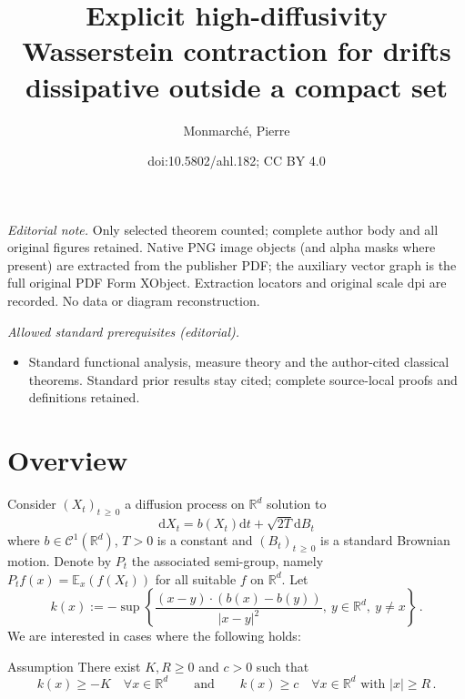 \documentclass[10pt]{amsart}
\title{Explicit high-diffusivity Wasserstein contraction for drifts dissipative outside a compact set}
\author{Monmarché, Pierre}
\date{doi:10.5802/ahl.182; CC BY 4.0}
\theoremstyle{definition}\newtheorem{defi}[theo]{Definition}\newtheorem{rema}[theo]{Remark}\newtheorem{exam}[theo]{Example}\newtheorem{exem}[theo]{Example}\newtheorem{nota}[theo]{Notation}
\newcommand{\R}{\mathbb R}
\newcommand{\bbE}{\mathbb E}
\newcommand{\clC}{\mathcal C}
\newcommand{\dd}{\mathrm{d}}
\newcommand{\1}{\mathbbm{1}}
\let\oldforall\forall
\renewcommand*{\forall}{\mathrel{\oldforall}}
\begin{document}
\maketitle
\noindent\textit{Editorial note.} Only selected theorem counted; complete author body and all original figures retained. Native PNG image objects (and alpha masks where present) are extracted from the publisher PDF; the auxiliary vector graph is the full original PDF Form XObject. Extraction locators and original scale dpi are recorded. No data or diagram reconstruction.\par\medskip
\noindent\textit{Allowed standard prerequisites (editorial).}\begin{itemize}
\item Standard functional analysis, measure theory and the author-cited classical theorems. Standard prior results stay cited; complete source-local proofs and definitions retained.
\end{itemize}\medskip

\section{Overview}\label{sec1}

Consider $(X_t)_{t\,\geqslant\,0}$ a diffusion process on $\R^d$ solution to
\begin{equation}\label{eq:EDS}
\dd X_t = b(X_t) \dd t + \sqrt{2T}\dd B_t
\end{equation}
where $b\in\clC^1(\R^d)$, $T>0$ is a constant and $(B_t)_{t\,\geqslant\,0}$ is a standard Brownian motion. Denote by $P_t$ the associated semi-group, namely $P_t f(x) = \bbE_x( f(X_t))$ for all suitable $f$ on $\R^d$. Let
\begin{equation}\label{eq:defk}
k(x):= - \sup \left\{ \frac{ (x-y)\cdot \left( b(x)-b(y)\right) }{|x-y|^2},\ y\in\R^d,\ y\neq x\right\}\,.
\end{equation}
We are interested in cases where the following holds:

\begin{enonce}{Assumption}\label{Assu1}
There exist $K,R\geqslant 0$ and $c>0$ such that
\begin{equation}\label{eq:conditionk}
k(x) \geqslant -K\quad \forall x\in\R^d \qquad \text{and}\qquad k(x) \geqslant c \quad \forall x\in\R^d\text{ with }|x|\geqslant R\,.
\end{equation}
\end{enonce}
\end{document}

